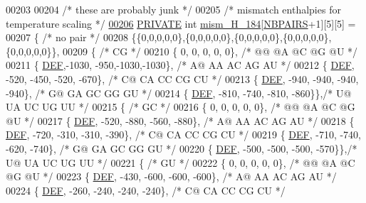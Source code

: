 \begin{DoxyCode}
00203 
00204 \textcolor{comment}{/* these are probably junk */}
00205 \textcolor{comment}{/* mismatch enthalpies for temperature scaling */}
\mbox{\hyperlink{1_88_84__epars_8h_aff0b5b9c5e493470fbc6aa26dd5e7544}{00206}} \mbox{\hyperlink{edit__cost_8h_a5e151c615eda34903514212f05a5ccf8}{PRIVATE}} \textcolor{keywordtype}{int} \mbox{\hyperlink{1_88_84__epars_8h_aff0b5b9c5e493470fbc6aa26dd5e7544}{mism\_H\_184}}[\mbox{\hyperlink{1_88_84__epars_8h_a5e75221c779d618eab81e096f37e32ce}{NBPAIRS}}+1][5][5] =
00207 \{ \textcolor{comment}{/* no pair */}
00208   \{\{0,0,0,0,0\},\{0,0,0,0,0\},\{0,0,0,0,0\},\{0,0,0,0,0\},\{0,0,0,0,0\}\},
00209   \{ \textcolor{comment}{/* CG */}
00210    \{   0,    0,    0,    0,    0\}, \textcolor{comment}{/* @@  @A  @C  @G  @U */}
00211    \{ \mbox{\hyperlink{1_88_84__epars_8h_a397419fc12b37ed479c8abb9d444d843}{DEF}},-1030, -950,-1030,-1030\}, \textcolor{comment}{/* A@  AA  AC  AG  AU */}
00212    \{ \mbox{\hyperlink{1_88_84__epars_8h_a397419fc12b37ed479c8abb9d444d843}{DEF}}, -520, -450, -520, -670\}, \textcolor{comment}{/* C@  CA  CC  CG  CU */}
00213    \{ \mbox{\hyperlink{1_88_84__epars_8h_a397419fc12b37ed479c8abb9d444d843}{DEF}}, -940, -940, -940, -940\}, \textcolor{comment}{/* G@  GA  GC  GG  GU */}
00214    \{ \mbox{\hyperlink{1_88_84__epars_8h_a397419fc12b37ed479c8abb9d444d843}{DEF}}, -810, -740, -810, -860\}\},\textcolor{comment}{/* U@  UA  UC  UG  UU */}
00215   \{ \textcolor{comment}{/* GC */}
00216    \{   0,    0,    0,    0,    0\}, \textcolor{comment}{/* @@  @A  @C  @G  @U */}
00217    \{ \mbox{\hyperlink{1_88_84__epars_8h_a397419fc12b37ed479c8abb9d444d843}{DEF}}, -520, -880, -560, -880\}, \textcolor{comment}{/* A@  AA  AC  AG  AU */}
00218    \{ \mbox{\hyperlink{1_88_84__epars_8h_a397419fc12b37ed479c8abb9d444d843}{DEF}}, -720, -310, -310, -390\}, \textcolor{comment}{/* C@  CA  CC  CG  CU */}
00219    \{ \mbox{\hyperlink{1_88_84__epars_8h_a397419fc12b37ed479c8abb9d444d843}{DEF}}, -710, -740, -620, -740\}, \textcolor{comment}{/* G@  GA  GC  GG  GU */}
00220    \{ \mbox{\hyperlink{1_88_84__epars_8h_a397419fc12b37ed479c8abb9d444d843}{DEF}}, -500, -500, -500, -570\}\},\textcolor{comment}{/* U@  UA  UC  UG  UU */}
00221   \{ \textcolor{comment}{/* GU */}
00222    \{   0,    0,    0,    0,    0\}, \textcolor{comment}{/* @@  @A  @C  @G  @U */}
00223    \{ \mbox{\hyperlink{1_88_84__epars_8h_a397419fc12b37ed479c8abb9d444d843}{DEF}}, -430, -600, -600, -600\}, \textcolor{comment}{/* A@  AA  AC  AG  AU */}
00224    \{ \mbox{\hyperlink{1_88_84__epars_8h_a397419fc12b37ed479c8abb9d444d843}{DEF}}, -260, -240, -240, -240\}, \textcolor{comment}{/* C@  CA  CC  CG  CU */}

\end{DoxyCode}

